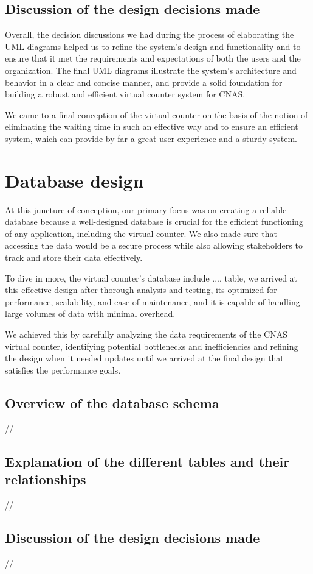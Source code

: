 \subsection{Discussion of the design decisions made}
Overall, the decision discussions we had during the process of elaborating the UML diagrams helped us to refine the system's design and functionality and to ensure that it met the requirements and expectations of both the users and the organization. The final UML diagrams illustrate the system's architecture and behavior in a clear and concise manner, and provide a solid foundation for building a robust and efficient virtual counter system for CNAS.

\medskip We came to a final conception of the virtual counter on the basis of the notion of eliminating the waiting time in such an effective way and to ensure an efficient system, which can provide by far a great user experience and a sturdy system. 
\newpage
\section{Database design}
At this juncture of conception, our primary focus was on creating a reliable database because a well-designed database is crucial for the efficient functioning of any application, including the virtual counter. We also made sure that accessing the data would be a secure process while also allowing stakeholders to track and store their data effectively.

\medskip To dive in more, the virtual counter's database include .... table, we arrived at this effective design after thorough analysis and testing, its optimized for performance, scalability, and ease of maintenance, and it is capable of handling large volumes of data with minimal overhead.   

We achieved this by carefully analyzing the data requirements of the CNAS virtual counter, identifying potential bottlenecks and inefficiencies and refining the design when it needed updates until we arrived at the final design that satisfies the performance goals. 
\subsection{Overview of the database schema}
//
\subsection{Explanation of the different tables and their relationships}
//
\subsection{Discussion of the design decisions made}

//